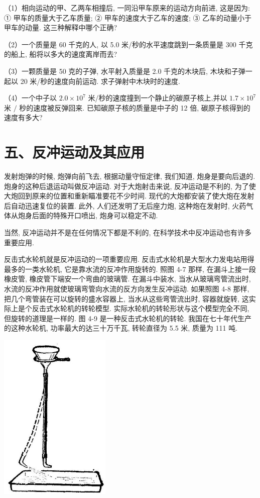 \documentclass[10pt]{article}
\begin{document}
（1）相向运动的甲、乙两车相撞后, 一同沿甲车原来的运动方向前进, 这是因为: ① 甲车的质量大于乙车质量; ② 甲车的速度大于乙车的速度; ③ 乙车的动量小于甲车的动量. 这三种解释中哪个正确?

（2）一个质量是 60 千克的人, 以 5.0 米/秒的水平速度跳到一条质量是 300 千克的船上, 船将以多大的速度离岸而去?

（3）一颗质量是 50 克的子弹, 水平射入质量是 2.0 千克的木块后, 木块和子弹一起以 20 米/秒的速度向前运动. 求子弹射中木块时的速度.

（4）一个中子以 \({2.0} \times {10}^{7}\) 米/秒的速度撞到一个静止的碳原子核上,并以 \({1.7} \times {10}^{7}\) 米 \(/\) 秒的速度被反弹回来. 已知碳原子核的质量是中子的 12 倍, 碳原子核得到的速度有多大?

\section*{五、反冲运动及其应用}

发射炮弹的时候, 炮弹向前飞去, 根据动量守恒定律, 我们知道, 炮身是要向后退的. 炮身的这种后退运动叫做反冲运动. 对于大炮射击来说, 反冲运动是不利的, 为了使大炮回到原来的位置和重新瞄准要花不少时间. 现代的大炮都安装了使大炮在发射后自动迅速复位的装置. 此外, 人们还发明了无后座力炮, 这种炮在发射时, 火药气体从炮身后面的特殊开口喷出, 炮身可以稳定不动.

当然, 反冲运动并不是在任何情况下都是不利的, 在科学技术中反冲运动也有许多重要应用.

反击式水轮机就是反冲运动的一项重要应用. 反击式水轮机是大型水力发电站用得最多的一类水轮机, 它是靠水流的反冲作用旋转的. 照图 4-7 那样, 在漏斗上接一段橡皮管, 橡皮管下端安一个弯曲的玻璃管. 在漏斗中装水, 当水从玻璃弯管流出时, 水流的反冲作用就使玻璃弯管向水流的反方向发生反冲运动. 如果照图 4-8 那样, 把几个弯管装在可以旋转的盛水容器上, 当水从这些弯管流出时, 容器就旋转, 这实际上是个反击式水轮机的转轮模型. 实际水轮机的转轮形状与这个模型完全不同, 但旋转的道理是一样的. 图 4-9 是一种反击式水轮机的转轮. 我国在七十年代生产的这种水轮机, 功率最大的达三十万千瓦, 转轮直径为 5.5 米, 质量为 111 吨.

\begin{center}
\includegraphics[max width=0.4\textwidth]{images/01912d55-147c-70aa-b0e0-1782a122f948_125_655139.jpg}
\end{center}
\end{document}
